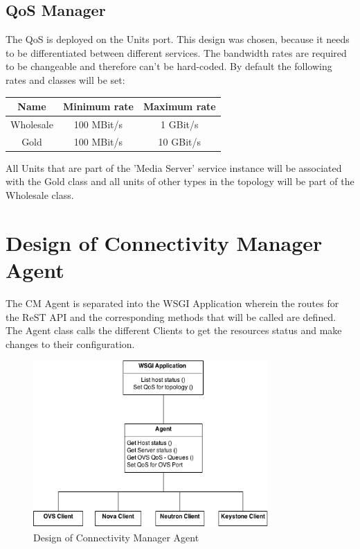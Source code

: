 \subsection{QoS Manager}

The QoS is deployed on the Units port. This design was chosen, because it needs to be differentiated between different services. The bandwidth rates are required to be changeable and therefore can't be hard-coded. By default the following rates and classes will be set:

\begin{center}
\begin{tabular}{|c|c|c|}
\hline \textbf{Name} & Minimum rate & Maximum rate \\ 
\hline Wholesale & 100 MBit/s & 1 GBit/s \\ 
\hline Gold & 100 MBit/s & 10 GBit/s \\ 
\hline 
\end{tabular} 
\end{center}

All Units that are part of the 'Media Server' service instance will be associated with the Gold class and all units of other types in the topology will be part of the Wholesale class.


\newpage
\section{Design of Connectivity Manager Agent}

The CM Agent is separated into the WSGI Application wherein the routes for the ReST API and the corresponding methods that will be called are defined. The Agent class calls the different Clients to get the resources status and make changes to their configuration.

\begin{figure}[H]
\centering

\includegraphics[width=0.8\textwidth]{images/design/cm_agent_design_class_diagram.png}

\caption{Design of Connectivity Manager Agent}
\end{figure}

